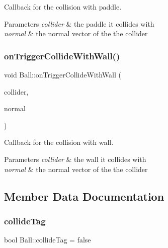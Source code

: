 Callback for the collision with paddle. 


\begin{DoxyParams}{Parameters}
{\em collider} & the paddle it collides with \\
\hline
{\em normal} & the normal vector of the the collider \\
\hline
\end{DoxyParams}
\mbox{\label{class_ball_a0afd6ef35ad091316c5002f755c54d75}} 
\subsubsection{\texorpdfstring{on\+Trigger\+Collide\+With\+Wall()}{onTriggerCollideWithWall()}}
{\footnotesize\ttfamily void Ball\+::on\+Trigger\+Collide\+With\+Wall (\begin{DoxyParamCaption}\item[{\mbox{\hyperlink{class_collider}{Collider}}}]{collider,  }\item[{\mbox{\hyperlink{struct_vector2_d}{Vector2D}}}]{normal }\end{DoxyParamCaption})}



Callback for the collision with wall. 


\begin{DoxyParams}{Parameters}
{\em collider} & the wall it collides with \\
\hline
{\em normal} & the normal vector of the the collider \\
\hline
\end{DoxyParams}


\subsection{Member Data Documentation}
\mbox{\label{class_ball_ab93ce7f0f587c81b5a1cfe437dd18f46}} 
\subsubsection{\texorpdfstring{collide\+Tag}{collideTag}}
{\footnotesize\ttfamily bool Ball\+::collide\+Tag = false\hspace{0.3cm}{\ttfamily [private]}}

